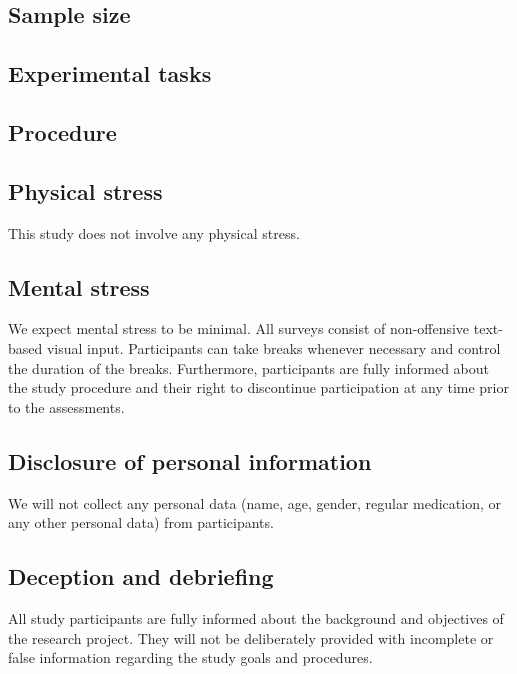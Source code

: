 \documentclass[11pt,twoside,a4paper]{article}
\begin{document}
\subsection{Sample size}

\subsection{Experimental tasks}

\subsection{Procedure}


\subsection{Physical stress}

This study does not involve any physical stress.

\subsection{Mental stress}

We expect mental stress to be minimal.
All surveys consist of non-offensive text-based visual input.
Participants can take breaks whenever necessary and control the duration of the breaks.
Furthermore, participants are fully informed about the study procedure and their right to discontinue participation at any time prior to the assessments.

\subsection{Disclosure of personal information}

We will not collect any personal data (name, age, gender, regular medication, or any other personal data) from participants.

\subsection{Deception and debriefing}

All study participants are fully informed about the background and objectives of the research project.
They will not be deliberately provided with incomplete or false information regarding the study goals and procedures.
\end{document}
